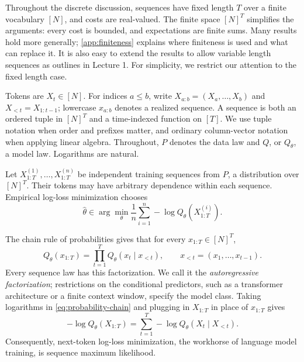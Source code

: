 \documentclass[11pt,twoside]{article}
\theoremstyle{definition}
\theoremstyle{remark}
\begin{document}
Throughout the discrete discussion, sequences have fixed length \(T\)
over a finite vocabulary \([N]\), and costs are real-valued. The finite
space \([N]^T\) simplifies the arguments: every cost is bounded, and
expectations are finite sums. Many results hold more generally;
\cref{app:finiteness} explains where finiteness is used and what can
replace it. It is also easy to extend the results to allow variable length
sequences as outlines in Lecture 1. For simplicity, we restrict our attention
to the fixed length case.

Tokens are \(X_t\in[N]\). For indices \(a\le b\), write
\(X_{a:b}=(X_a,\ldots,X_b)\) and \(X_{<t}=X_{1:t-1}\);
lowercase \(x_{a:b}\) denotes a realized sequence. A sequence is both an
ordered tuple in \([N]^T\) and a time-indexed function on \([T]\).
We use tuple notation when order and prefixes matter, and ordinary
column-vector notation when applying linear algebra. Throughout, \(P\)
denotes the data law and \(Q\), or \(Q_\theta\), a model law.
Logarithms are natural.

Let \(X^{(1)}_{1:T},\ldots,X^{(n)}_{1:T}\) be independent training sequences
from \(P\), a distribution over $[N]^T$.
Their tokens may have arbitrary dependence within each sequence.
Empirical log-loss minimization chooses
\begin{equation}
  \widehat\theta\in\arg\min_\theta
  \frac1n\sum_{i=1}^n-\log Q_\theta(X^{(i)}_{1:T}).
  \label{eq:empirical-likelihood}
\end{equation}

The chain rule of probabilities gives that for every $x_{1:T}\in [N]^T$,
\begin{equation}
  Q_\theta(x_{1:T})
  =\prod_{t=1}^T Q_\theta(x_t\mid x_{<t}),
  \qquad x_{<t}=(x_1,\ldots,x_{t-1}).
  \label{eq:probability-chain}
\end{equation}
Every sequence law has this factorization. We call it the
\emph{autoregressive factorization}; restrictions on the conditional
predictors, such as a transformer architecture or a finite context window,
specify the model class. Taking logarithms in
\cref{eq:probability-chain} and plugging in $X_{1:T}$ in place of
$x_{1:T}$ gives
\begin{equation}
  -\log Q_\theta(X_{1:T})
  =\sum_{t=1}^T-\log Q_\theta(X_t\mid X_{<t}).
  \label{eq:next-token-loss}
\end{equation}
Consequently, next-token log-loss minimization, the workhorse of language model training,
 is sequence maximum likelihood.
\end{document}
